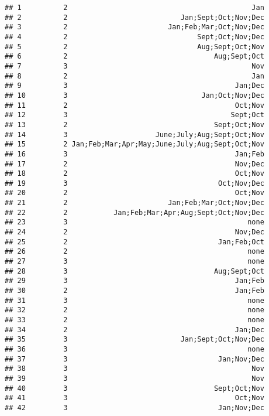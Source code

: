 \documentclass[
]{article}
\begin{document}
\begin{verbatim}
## 1          2                                            Jan
## 2          2                           Jan;Sept;Oct;Nov;Dec
## 3          2                        Jan;Feb;Mar;Oct;Nov;Dec
## 4          2                               Sept;Oct;Nov;Dec
## 5          2                               Aug;Sept;Oct;Nov
## 6          2                                   Aug;Sept;Oct
## 7          3                                            Nov
## 8          2                                            Jan
## 9          3                                        Jan;Dec
## 10         3                                Jan;Oct;Nov;Dec
## 11         2                                        Oct;Nov
## 12         3                                       Sept;Oct
## 13         2                                   Sept;Oct;Nov
## 14         3                     June;July;Aug;Sept;Oct;Nov
## 15         2 Jan;Feb;Mar;Apr;May;June;July;Aug;Sept;Oct;Nov
## 16         3                                        Jan;Feb
## 17         2                                        Nov;Dec
## 18         2                                        Oct;Nov
## 19         3                                    Oct;Nov;Dec
## 20         2                                        Oct;Nov
## 21         2                        Jan;Feb;Mar;Oct;Nov;Dec
## 22         2           Jan;Feb;Mar;Apr;Aug;Sept;Oct;Nov;Dec
## 23         3                                           none
## 24         2                                        Nov;Dec
## 25         2                                    Jan;Feb;Oct
## 26         2                                           none
## 27         3                                           none
## 28         3                                   Aug;Sept;Oct
## 29         3                                        Jan;Feb
## 30         2                                        Jan;Feb
## 31         3                                           none
## 32         2                                           none
## 33         2                                           none
## 34         2                                        Jan;Dec
## 35         3                           Jan;Sept;Oct;Nov;Dec
## 36         3                                           none
## 37         3                                    Jan;Nov;Dec
## 38         3                                            Nov
## 39         3                                            Nov
## 40         3                                   Sept;Oct;Nov
## 41         3                                        Oct;Nov
## 42         3                                    Jan;Nov;Dec

\end{verbatim}
\end{document}
